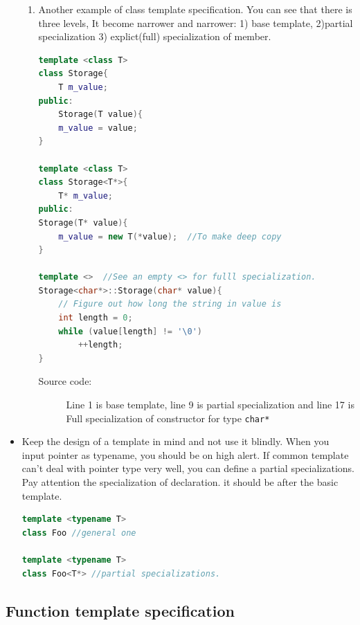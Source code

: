 \documentclass[a4paper,11pt,twoside]{book}
\begin{document}
\begin{itemize}
\begin{enumerate}
		\item Another example of class template specification. You can see that there is three levels, It become narrower and narrower: 1) base template, 2)partial specialization 3) explict(full) specialization of member.
\begin{lstlisting}[frame=single, language=c++]
template <class T>
class Storage{
	T m_value;
public:
	Storage(T value){
	m_value = value;
}

template <class T>
class Storage<T*>{
	T* m_value;
public:
Storage(T* value){
	m_value = new T(*value);  //To make deep copy
}

template <>  //See an empty <> for fulll specialization.
Storage<char*>::Storage(char* value){
	// Figure out how long the string in value is
	int length = 0;
	while (value[length] != '\0')
		++length;
}
\end{lstlisting}
\begin{description}
	\item[Source code:] Line 1 is base template, line 9 is partial specialization and line 17 is Full specialization of constructor for type \texttt{char*} 
\end{description}

\end{enumerate}

    \item Keep the design of a template in mind and not use it blindly. When you input pointer as typename, you should be on high alert. If common template can't deal with pointer type very well, you can define a partial specializations. Pay attention the specialization of declaration. it should be after the basic template.

\begin{lstlisting}[frame=single, language=c++]
template <typename T>
class Foo //general one

template <typename T>
class Foo<T*> //partial specializations.
\end{lstlisting}

\end{itemize}

\subsection{Function template specification}
\end{document}

